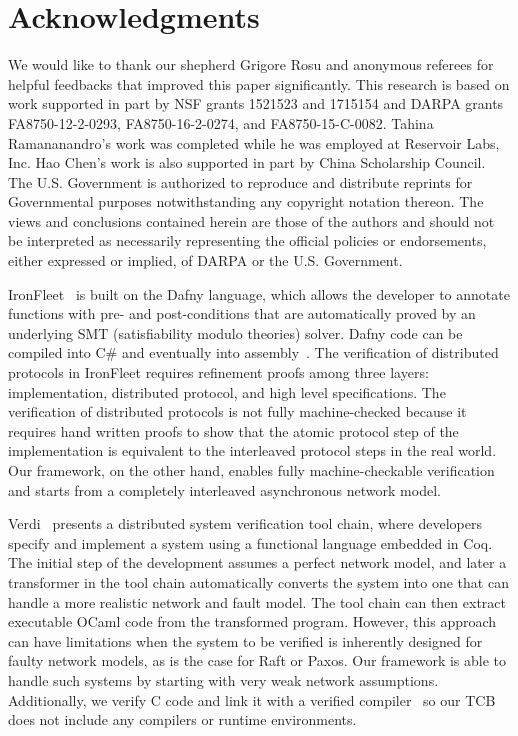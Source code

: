 \section*{Acknowledgments}
We would like to thank our shepherd Grigore Rosu and anonymous
referees for helpful feedbacks that improved this paper significantly.
This research is based on work supported in part by NSF grants 1521523
and 1715154 and DARPA grants FA8750-12-2-0293, FA8750-16-2-0274, and
FA8750-15-C-0082. Tahina Ramananandro's work was completed while he
was employed at Reservoir Labs, Inc. Hao Chen's work is also supported
in part by China Scholarship Council.  The U.S. Government is
authorized to reproduce and distribute reprints for Governmental
purposes notwithstanding any copyright notation thereon. The views and
conclusions contained herein are those of the authors and should not
be interpreted as necessarily representing the official policies or
endorsements, either expressed or implied, of DARPA or the
U.S. Government.



 IronFleet~\cite{ironfleet} is built on the Dafny language, 
which allows the developer to annotate functions with pre- and post-conditions that are automatically proved 
by an underlying SMT (satisfiability modulo theories) solver.
Dafny code can be compiled into C\# and eventually into assembly~\cite{ironclad}. 
The verification of distributed protocols in IronFleet requires refinement proofs among three layers: 
implementation, distributed protocol, and high level specifications.
The verification of distributed protocols is not fully machine-checked because
it requires hand written proofs to show that the atomic protocol step of the implementation
is equivalent to the interleaved protocol steps in the real world.
Our framework, on the other hand, enables fully machine-checkable verification and starts from a completely interleaved asynchronous network model.

Verdi~\cite{verdi} presents a distributed system verification tool chain, 
where developers specify and implement a system using a functional language embedded in Coq.
The initial step of the development assumes a perfect network model, and later a transformer
in the tool chain automatically converts the system into one that can handle a more realistic network and fault model.
The tool chain can then extract executable OCaml code from the transformed program.
However, this approach can have limitations when the system to be verified is inherently designed for faulty network models, as is the case for Raft or Paxos.
Our framework is able to handle such systems by starting with very weak network assumptions.
Additionally, we verify C code and link it with a verified compiler~\cite{compcert} so our TCB does not include any compilers or runtime environments.

